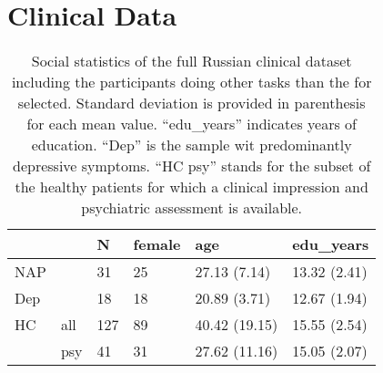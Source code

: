 \chapter{Clinical Data} %
\label{appendix:clincal_data} %

\begin{table}[h!]
\begin{center}
\begin{tabular}{llllll}
\hline
    &     & \textbf{N} & \textbf{female} & \textbf{age}  & \textbf{edu\_years} \\ \hline
NAP &     & 31         & 25              & 27.13 (7.14)  & 13.32 (2.41)        \\
Dep &     & 18         & 18              & 20.89 (3.71)  & 12.67 (1.94)        \\
HC  & all & 127        & 89              & 40.42 (19.15) & 15.55 (2.54)        \\
    & psy & 41         & 31              & 27.62 (11.16) & 15.05 (2.07)        \\ \hline
\end{tabular}
\captionsetup{width=\textwidth}
\caption[Full Russian Clinical Dataset.]{\label{tab:data:ru:full_sample} Social statistics of the full Russian clinical dataset including the participants doing other tasks than the for selected. Standard deviation is provided in parenthesis for each mean value. ``edu\_years'' indicates years of education. ``Dep'' is the sample wit predominantly depressive symptoms. ``HC psy'' stands for the subset of the healthy patients for which a clinical impression and psychiatric assessment is available.}
\end{center}
\end{table}

